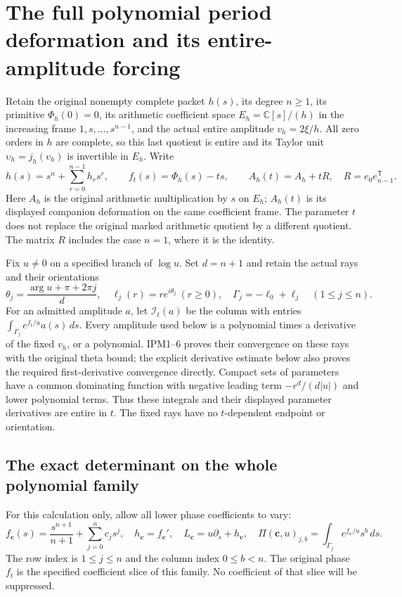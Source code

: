 \documentclass[11pt,a4paper]{article}
\begin{document}


\section{The full polynomial period deformation and its entire-amplitude forcing}
\label{GraphV3:sec:pde-full-deformation}

Retain the original nonempty complete packet $h(s)$, its degree $n\geq1$,
its primitive $\Phi_h(0)=0$, its arithmetic coefficient space
$E_h=\mathbb{C}[s]/(h)$ in the increasing frame $1,s,\ldots,s^{n-1}$,
and the actual entire amplitude $v_h=2\xi/h$. All zero orders in $h$
are complete, so this last quotient is entire and its Taylor unit
$\upsilon_h=j_h(v_h)$ is invertible in $E_h$. Write
\[
 h(s)=s^n+\sum_{r=0}^{n-1}h_rs^r,\qquad
 f_t(s)=\Phi_h(s)-ts,\qquad
 A_h(t)=A_h+tR,\quad R=e_0e_{n-1}^{\mathsf T}.
 \tag{PDE1}
\]
Here $A_h$ is the original arithmetic multiplication by $s$ on $E_h$;
$A_h(t)$ is its displayed companion deformation on the same coefficient
frame. The parameter $t$ does not replace the original marked arithmetic
quotient by a different quotient. The matrix $R$ includes the case
$n=1$, where it is the identity.

Fix $u\ne0$ on a specified branch of $\log u$. Set $d=n+1$ and retain
the actual rays and their orientations
\[
 \theta_j=\frac{\arg u+\pi+2\pi j}{d},\quad
 \ell_j(r)=re^{i\theta_j}\ (r\geq0),\quad
 \Gamma_j=-\ell_0+\ell_j\quad(1\leq j\leq n).
 \tag{PDE2}
\]
For an admitted amplitude $a$, let $\mathcal I_t(a)$ be the column with
entries $\int_{\Gamma_j}e^{f_t/u}a(s)\,ds$. Every amplitude used below is
a polynomial times a derivative of the fixed $v_h$, or a polynomial.
IPM1--6 proves their convergence on these rays with the original theta
bound; the explicit derivative estimate below also proves the required
first-derivative convergence directly. Compact sets of parameters have
a common dominating function with negative leading term
$-r^d/(d|u|)$ and lower polynomial terms. Thus these integrals and their
displayed parameter derivatives are entire in $t$. The fixed rays have
no $t$-dependent endpoint or orientation.

\subsection{The exact determinant on the whole polynomial family}

For this calculation only, allow all lower phase coefficients to vary:
\[
 f_{\mathbf c}(s)=\frac{s^{n+1}}{n+1}+\sum_{j=0}^n c_js^j,
 \quad h_{\mathbf c}=f_{\mathbf c}',\quad
 L_{\mathbf c}=u\partial_s+h_{\mathbf c},\quad
 \Pi(\mathbf c,u)_{j,b}
       =\int_{\Gamma_j}e^{f_{\mathbf c}/u}s^b\,ds.
 \tag{PDE3}
\]
The row index is $1\leq j\leq n$ and the column index $0\leq b<n$.
The original phase $f_t$ is the specified coefficient slice of this
family. No coefficient of that slice will be suppressed.
\end{document}
